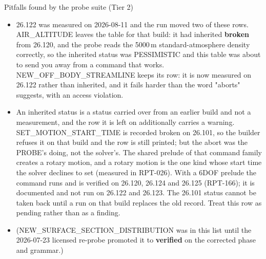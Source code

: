 \documentclass[aspectratio=169,10pt]{beamer}
\begin{document}
\begin{frame}[allowframebreaks]{Pitfalls found by the probe suite (Tier 2)}
\begin{itemize}
    \item 26.122 was measured on 2026-08-11 and the run moved two of these rows. AIR\_ALTITUDE leaves the table for that build: it had inherited {\color{statusred}\textbf{broken}} from 26.120, and the probe reads the 5000\,m standard-atmosphere density correctly, so the inherited status was PESSIMISTIC and this table was about to send you away from a command that works. NEW\_OFF\_BODY\_STREAMLINE keeps its row: it is now measured on 26.122 rather than inherited, and it fails harder than the word "aborts" suggests, with an access violation.
    \item An inherited status is a status carried over from an earlier build and not a measurement, and the row it is left on additionally carries a warning. SET\_MOTION\_START\_TIME is recorded broken on 26.101, so the builder refuses it on that build and the row is still printed; but the abort was the PROBE's doing, not the solver's. The shared prelude of that command family creates a rotary motion, and a rotary motion is the one kind whose start time the solver declines to set (measured in RPT-026). With a 6DOF prelude the command runs and is verified on 26.120, 26.124 and 26.125 (RPT-166); it is documented and not run on 26.122 and 26.123. The 26.101 status cannot be taken back until a run on that build replaces the old record. Treat this row as pending rather than as a finding.
    \item (NEW\_SURFACE\_SECTION\_DISTRIBUTION was in this list until the 2026-07-23 licensed re-probe promoted it to {\color{statusblue}\textbf{verified}} on the corrected phase and grammar.)
  \end{itemize}
\end{frame}
\end{document}

